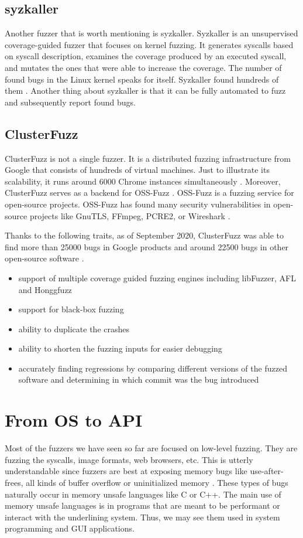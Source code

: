 \subsection{syzkaller}
Another fuzzer that is worth mentioning is syzkaller. Syzkaller is an unsupervised coverage-guided fuzzer that focuses on kernel fuzzing. It generates syscalls based on syscall description, examines the coverage produced by an executed syscall, and mutates the ones that were able to increase the coverage. The number of found bugs in the Linux kernel speaks for itself. Syzkaller found hundreds of them \cite{syzkaller2020bugs}. Another thing about syzkaller is that it can be fully automated to fuzz and subsequently report found bugs.


\subsection{ClusterFuzz}
ClusterFuzz is not a single fuzzer. It is a distributed fuzzing infrastructure from Google that consists of hundreds of virtual machines. Just to illustrate its scalability, it runs around 6000 Chrome instances simultaneously \cite{xu2017designing}. Moreover, ClusterFuzz serves as a backend for OSS-Fuzz \cite{ossfuzz2020readme}. OSS-Fuzz is a fuzzing service for open-source projects. OSS-Fuzz has found many security vulnerabilities in open-source projects like GnuTLS, FFmpeg, PCRE2, or Wireshark \cite{chang2017oss}.

Thanks to the following traits, as of September 2020, ClusterFuzz was able to find more than 25000 bugs in Google products and around 22500 bugs in other open-source software \cite{clusterfuzz2020readme}.

\begin{itemize}
    \item support of multiple coverage guided fuzzing engines including libFuzzer, AFL and Honggfuzz
    \item support for black-box fuzzing
    \item ability to duplicate the crashes
    \item ability to shorten the fuzzing inputs for easier debugging
    \item accurately finding regressions by comparing different versions of the fuzzed software and determining in which commit was the bug introduced
\end{itemize}


\section{From OS to API}
Most of the fuzzers we have seen so far are focused on low-level fuzzing. They are fuzzing the syscalls, image formats, web browsers, etc. This is utterly understandable since fuzzers are best at exposing memory bugs like use-after-frees, all kinds of buffer overflow or uninitialized memory \cite{chang2017oss}. These types of bugs naturally occur in memory unsafe languages like C or C++. The main use of memory unsafe languages is in programs that are meant to be performant or interact with the underlining system. Thus, we may see them used in system programming and GUI applications.

